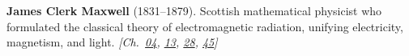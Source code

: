 \textbf{James Clerk Maxwell} (1831–1879). Scottish mathematical physicist who formulated the classical theory of electromagnetic radiation, unifying electricity, magnetism, and light. \emph{[Ch.~\hyperref[ch:energytransmission]{04}, \hyperref[ch:poissonsspot]{13}, \hyperref[ch:negativetemperature]{28}, \hyperref[ch:maxwelldemon]{45}]}

